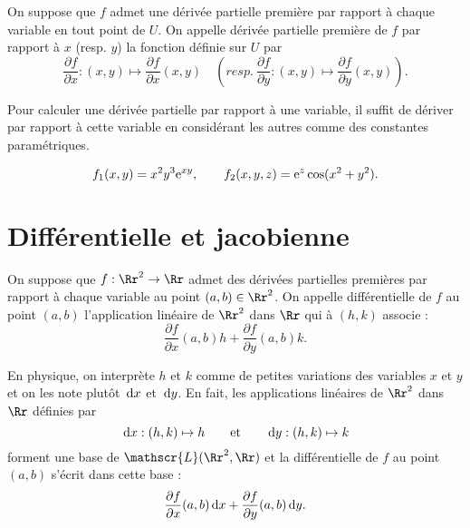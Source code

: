 \documentclass[class=report,crop=false]{standalone}
\begin{document}
\vskip6mm

\begin{definition}On suppose que $f$ admet une dérivée partielle première par rapport à chaque variable en tout point de $U$. On appelle dérivée partielle première de $f$ par rapport à $x$ (resp. $y$) la fonction définie sur $U$ par 
$$\displaystyle \frac{\partial f}{\partial x}:(x,y)\mapsto \frac{\partial f}{\partial x}(x,y)\quad \left(resp.\ \frac{\partial f}{\partial y}:(x,y)\mapsto \frac{\partial f}{\partial y}(x,y)\right).$$
\end{definition}

\vskip6mm

Pour calculer une dérivée partielle par rapport à une variable, il suffit de dériver par rapport à cette variable en considérant les autres comme des constantes paramétriques.

\vskip6mm

$$f_1(x,y)=x^2y^3{\rm e} ^{xy},\qquad f_2(x,y,z)={\rm e}^z\cos (x^2+y^2).$$

\vskip8mm

\section{Différentielle et jacobienne}

\vskip4mm

\begin{definition}On suppose que $f:\Rr^2\to \Rr$ admet des dérivées partielles premières par rapport à chaque variable au point $(a,b)\in \Rr^2$. On appelle différentielle de $f$ au point $(a,b)$ l'application linéaire de $\Rr^2$ dans $\Rr$ qui à $(h,k)$ associe :
$$\frac{\partial f}{\partial x}(a,b)h+\frac{\partial f}{\partial y}(a,b)k.$$
\end{definition}

\vskip4mm

En physique, on interprète $h$ et $k$ comme de petites variations des variables $x$ et $y$ et on les note plut\^ot $\,\mathrm{d} x$ et $\,\mathrm{d} y$. En fait, les applications linéaires de $\Rr^2$ dans $\Rr$ définies par
$$\,\mathrm{d} x:(h,k)\mapsto h\qquad \mbox{et}\qquad \,\mathrm{d} y:(h,k)\mapsto k$$
forment une base de $\mathscr{L}(\Rr^2,\Rr)$ et la différentielle de $f$ au point $(a,b)$ s'écrit dans cette base :
$$\frac{\partial f}{\partial x}(a,b)\,\mathrm{d} x+\frac{\partial f}{\partial y}(a,b)\,\mathrm{d} y.$$

\vskip2mm
\end{document}
